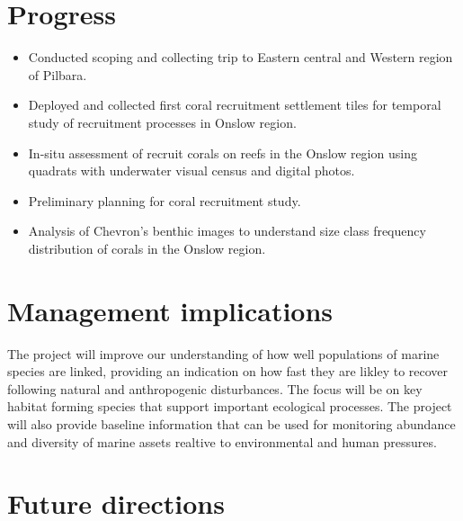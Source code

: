\documentclass[version=last, paper=a4, DIV=18, usenames, dvipsnames]{scrartcl}
\begin{document}
\section{Progress}



\begin{itemize}

  \item Conducted scoping and collecting trip to Eastern central and Western region of Pilbara.

  \item Deployed and collected first coral recruitment settlement tiles for temporal study of recruitment processes in Onslow region.

  \item In-situ assessment of recruit corals on reefs in the Onslow region using quadrats with underwater visual census and digital photos.

  \item Preliminary planning for coral recruitment study.

  \item Analysis of Chevron's benthic images to understand size class frequency distribution of corals in the Onslow region.

\end{itemize}






\section{Management implications}



The project will improve our understanding of how well populations of marine species are linked, providing an indication on how fast they are likley to recover following natural and anthropogenic disturbances. The focus will be on key habitat forming species that support important ecological processes. The project will also provide baseline information that can be used for monitoring abundance and diversity of marine assets realtive to environmental and human pressures.






\section{Future directions}
\end{document}
